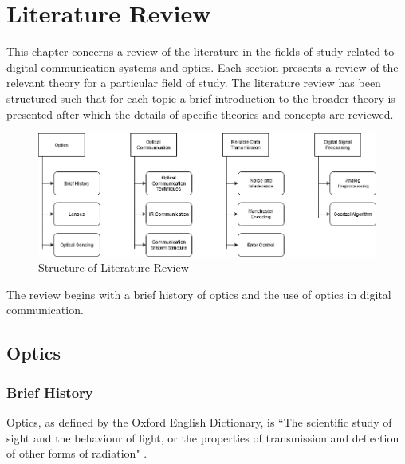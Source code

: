 \chapter{Literature Review}
\label{ch_literature}

This chapter concerns a review of the literature in the fields of study related to digital communication systems and optics.
Each section presents a review of the relevant theory for a particular field of study. %
The literature review has been structured such that for each topic a brief introduction to the broader theory is presented after which the details of specific theories and concepts are reviewed.

\begin{figure}[H]
	\centering
	\includegraphics[width=\linewidth]{figures/litreview/litreview_overview.png}
	\caption{Structure of Literature Review}
	\label{fig:litreview_overview}
\end{figure}

The review begins with a brief history of optics and the use of optics in digital communication. 

\section{Optics}

\subsection{Brief History}

Optics, as defined by the Oxford English Dictionary, is ``The scientific study of sight and the behaviour of light, or the properties of transmission and deflection of other forms of radiation" \cite{oroptics2010}.

